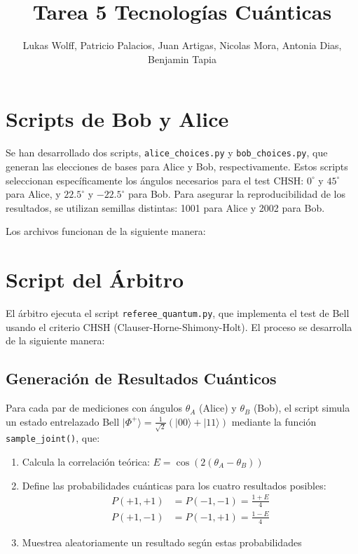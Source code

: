 \documentclass[11pt]{article}
\title{Tarea 5 Tecnologías Cuánticas}
\author{Lukas Wolff, 
        Patricio Palacios,
        Juan Artigas,
        Nicolas Mora,
        Antonia Dias,
        Benjamin Tapia}
\date{}
\begin{document}
\maketitle

\section{Scripts de Bob y Alice}

Se han desarrollado dos scripts, \texttt{alice\_choices.py} y \texttt{bob\_choices.py}, que generan las elecciones de bases para Alice y Bob, respectivamente. Estos scripts seleccionan específicamente los ángulos necesarios para el test CHSH: $0^\circ$ y $45^\circ$ para Alice, y $22.5^\circ$ y $-22.5^\circ$ para Bob. Para asegurar la reproducibilidad de los resultados, se utilizan semillas distintas: 1001 para Alice y 2002 para Bob.

Los archivos funcionan de la siguiente manera:

\section{Script del Árbitro}

El árbitro ejecuta el script \texttt{referee\_quantum.py}, que implementa el test de Bell usando el criterio CHSH (Clauser-Horne-Shimony-Holt). El proceso se desarrolla de la siguiente manera:

\subsection{Generación de Resultados Cuánticos}

Para cada par de mediciones con ángulos $\theta_A$ (Alice) y $\theta_B$ (Bob), el script simula un estado entrelazado Bell $|\Phi^+\rangle = \frac{1}{\sqrt{2}}(|00\rangle + |11\rangle)$ mediante la función \texttt{sample\_joint()}, que:

\begin{enumerate}
    \item Calcula la correlación teórica: $E = \cos(2(\theta_A - \theta_B))$
    \item Define las probabilidades cuánticas para los cuatro resultados posibles:
    \begin{align}
        P(+1,+1) &= P(-1,-1) = \frac{1+E}{4} \\
        P(+1,-1) &= P(-1,+1) = \frac{1-E}{4}
    \end{align}
    \item Muestrea aleatoriamente un resultado según estas probabilidades
\end{enumerate}
\end{document}
